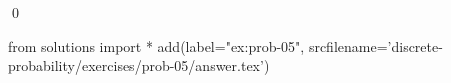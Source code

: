 
\begin{ex} 
  \label{ex:prob-05}
  
  \qed
\end{ex} 
\begin{python0}
from solutions import *
add(label="ex:prob-05",
    srcfilename='discrete-probability/exercises/prob-05/answer.tex') 
\end{python0}

